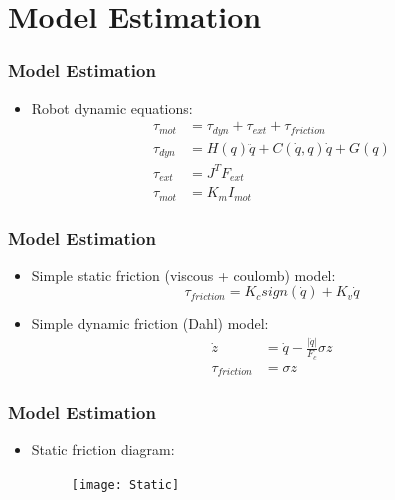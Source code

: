 \documentclass[12pt,english]{beamer}
\begin{document}
  \section{Model Estimation}
  \begin{frame}
    \frametitle{Model Estimation}
    \begin{itemize}
      \item Robot dynamic equations:
      \begin{align}
        \tau_{mot} &= \tau_{dyn} + \tau_{ext} + \tau_{friction}\\
        \tau_{dyn} &= H\left(q\right)\ddot{q} + C\left(\dot{q} , q \right)\dot{q} + G\left(q \right)\\
        \tau_{ext} &= J^{T} F_{ext}\\
        \tau_{mot} &= K_{m} I_{mot}
      \end{align}
    \end{itemize}
  \end{frame}
  
  \begin{frame}
    \frametitle{Model Estimation}
    \begin{itemize}
      \item Simple static friction (viscous + coulomb) model:
      \begin{equation}
        \tau_{friction} = K_{c} sign\left(\dot{q}\right) + K_{v} \dot{q}
      \end{equation}
      \item Simple dynamic friction (Dahl) model:
      \begin{align}
        \dot{z} &= \dot{q} - \frac{\left|\dot{q}\right|}{F_{c}} \sigma z \\
        \tau_{friction} &= \sigma z
      \end{align}
    \end{itemize}
  \end{frame}
  
  \begin{frame}
    \frametitle{Model Estimation}
    \begin{itemize}
      \item Static friction diagram:
      \begin{figure}
        \texttt{[image: Static]} \,
      \end{figure}
    \end{itemize}
  \end{frame}
  
\end{document}
